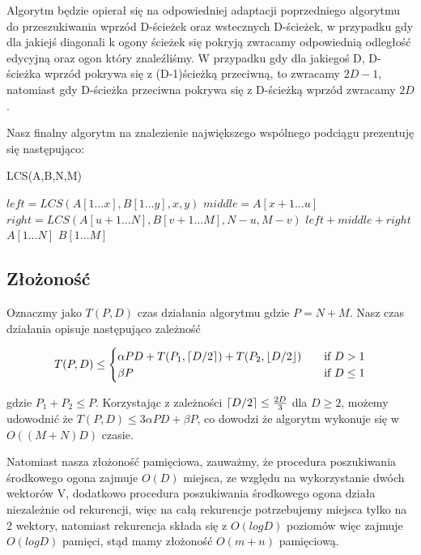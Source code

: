 \documentclass[12pt]{article}
\DeclarePairedDelimiter\ceil{\lceil}{\rceil}
\DeclarePairedDelimiter\floor{\lfloor}{\rfloor}
\begin{document}
\vspace{5mm}

Algorytm będzie opierał się na odpowiedniej adaptacji poprzedniego algorytmu do przeszukiwania wprzód D-ścieżek oraz wstecznych D-ścieżek, w przypadku gdy dla jakiejś diagonali k ogony ścieżek się pokryją zwracamy odpowiednią odległość edycyjną oraz ogon który znaleźliśmy. W przypadku gdy dla jakiegoś D, D-ścieżka wprzód pokrywa się z (D-1)ścieżką przeciwną, to zwracamy $2D - 1$, natomiast gdy D-ścieżka przeciwna pokrywa się z D-ścieżką wprzód zwracamy $2D$.

\vspace{2mm}

Nasz finalny algorytm na znalezienie największego wspólnego podciągu prezentuję się następująco:

\begin{algorithm}
\caption{LCS(A,B,N,M)}
\begin{algorithmic}
        \STATE $left = LCS(A[1\dots x],B[1\dots y],x,y)$
        \STATE $middle = A[x+1\dots u]$
        \STATE $right = LCS(A[u+1\dots N],B[v+1\dots M],N-u,M-v)$
        \RETURN $left + middle + right$
        \RETURN $A[1\dots N]$
    \ELSE
        \RETURN $B[1\dots M]$
    \ENDIF
\ENDIF
\end{algorithmic}
\end{algorithm}

\subsection{Złożoność}

Oznaczmy jako $T(P,D)$ czas działania algorytmu gdzie $P = N + M$. Nasz czas działania opisuje następująco zależność

\[   
T(P,D) \leq 
     \begin{cases}
       \alpha PD + T(P_{1},\ceil*{D/2}) + T(P_{2}, \floor{D/2}) &\quad\text{if } D > 1 \\
       \beta P &\quad\text{if } D \leq 1 \\
     \end{cases}
\]


gdzie $P_{1} + P_{2} \leq P$. Korzystając z zależności $\ceil*{D/2} \leq \frac{2D}{3}$ dla $D \geq 2$, możemy udowodnić że $T(P,D) \leq 3\alpha PD + \beta P$, co dowodzi że algorytm wykonuje się w $O((M+N)D)$ czasie.
\vspace{4mm}    

Natomiast nasza złożoność pamięciowa, zauważmy, że procedura poszukiwania środkowego ogona zajmuje $O(D)$ miejsca, ze względu na wykorzystanie dwóch wektorów V, dodatkowo procedura poszukiwania środkowego ogona działa niezależnie od rekurencji, więc na całą rekurencje potrzebujemy miejsca tylko na 2 wektory, natomiast rekurencja składa się z $O(logD)$ poziomów więc zajmuje $O(logD)$ pamięci, stąd mamy złożoność $O(m+n)$ pamięciową.
\end{document}
